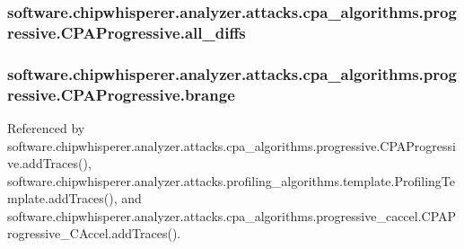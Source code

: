 \subsubsection[{all\+\_\+diffs}]{\setlength{\rightskip}{0pt plus 5cm}software.\+chipwhisperer.\+analyzer.\+attacks.\+cpa\+\_\+algorithms.\+progressive.\+C\+P\+A\+Progressive.\+all\+\_\+diffs}\label{classsoftware_1_1chipwhisperer_1_1analyzer_1_1attacks_1_1cpa__algorithms_1_1progressive_1_1CPAProgressive_abec0da0ad8394176108af5d773b02687}
\hypertarget{classsoftware_1_1chipwhisperer_1_1analyzer_1_1attacks_1_1cpa__algorithms_1_1progressive_1_1CPAProgressive_a66c873c10645a405c0994acd78cb4026}{}
\subsubsection[{brange}]{\setlength{\rightskip}{0pt plus 5cm}software.\+chipwhisperer.\+analyzer.\+attacks.\+cpa\+\_\+algorithms.\+progressive.\+C\+P\+A\+Progressive.\+brange}\label{classsoftware_1_1chipwhisperer_1_1analyzer_1_1attacks_1_1cpa__algorithms_1_1progressive_1_1CPAProgressive_a66c873c10645a405c0994acd78cb4026}


Referenced by software.\+chipwhisperer.\+analyzer.\+attacks.\+cpa\+\_\+algorithms.\+progressive.\+C\+P\+A\+Progressive.\+add\+Traces(), software.\+chipwhisperer.\+analyzer.\+attacks.\+profiling\+\_\+algorithms.\+template.\+Profiling\+Template.\+add\+Traces(), and software.\+chipwhisperer.\+analyzer.\+attacks.\+cpa\+\_\+algorithms.\+progressive\+\_\+caccel.\+C\+P\+A\+Progressive\+\_\+\+C\+Accel.\+add\+Traces().

\hypertarget{classsoftware_1_1chipwhisperer_1_1analyzer_1_1attacks_1_1cpa__algorithms_1_1progressive_1_1CPAProgressive_adfd506df2b2c62432135051e58d8e355}{}
